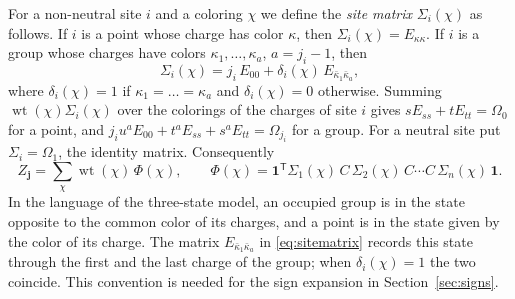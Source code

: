 \documentclass{amsart}
\theoremstyle{definition}
\theoremstyle{remark}
\numberwithin{equation}{section}
\newcommand{\one}{\mathbf{1}}
\newcommand{\jj}{\mathbf{j}}
\newcommand{\wt}{\operatorname{wt}}
\begin{document}
For a non-neutral site $i$ and a coloring $\chi$ we define the \emph{site matrix} $\Sigma_i(\chi)$ as follows. If $i$ is a point whose charge has color $\kappa$, then $\Sigma_i(\chi)=E_{\kappa\kappa}$. If $i$ is a group whose charges have colors $\kappa_1,\dots,\kappa_a$, $a=j_i-1$, then
\begin{equation}\label{eq:sitematrix}
\Sigma_i(\chi)=j_i\,E_{00}+\delta_i(\chi)\,E_{\bar\kappa_1\bar\kappa_a},
\end{equation}
where $\delta_i(\chi)=1$ if $\kappa_1=\dots=\kappa_a$ and $\delta_i(\chi)=0$ otherwise. Summing $\wt(\chi)\Sigma_i(\chi)$ over the colorings of the charges of site $i$ gives $sE_{ss}+tE_{tt}=\Omega_0$ for a point, and $j_iu^aE_{00}+t^aE_{ss}+s^aE_{tt}=\Omega_{j_i}$ for a group. For a neutral site put $\Sigma_i=\Omega_1$, the identity matrix. Consequently
\begin{equation}\label{eq:Zcharges}
Z_\jj=\sum_\chi\wt(\chi)\,\Phi(\chi),\qquad \Phi(\chi)=\one^{\mathsf T}\Sigma_1(\chi)\,C\,\Sigma_2(\chi)\,C\cdots C\,\Sigma_n(\chi)\,\one .
\end{equation}
In the language of the three-state model, an occupied group is in the state opposite to the common color of its charges, and a point is in the state given by the color of its charge. The matrix $E_{\bar\kappa_1\bar\kappa_a}$ in \eqref{eq:sitematrix} records this state through the first and the last charge of the group; when $\delta_i(\chi)=1$ the two coincide. This convention is needed for the sign expansion in Section~\ref{sec:signs}.
\end{document}
